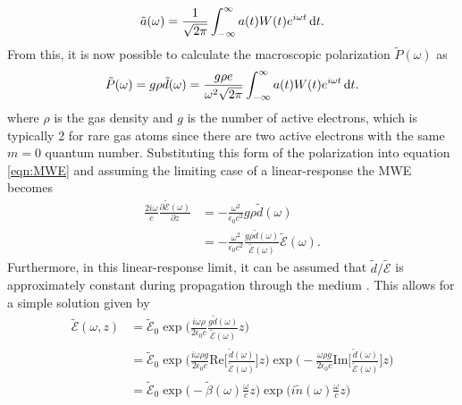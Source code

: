 \begin{equation}
	\tilde{a}(\omega)=\frac{1}{\sqrt{2\pi}}\int_{-\infty}^{\infty}a(t)W(t)e^{i\omega t}\mathop{}\!\mathrm{d} t.
\end{equation}
From this, it is now possible to calculate the macroscopic polarization $\tilde{P}(\omega)$ as 
\begin{equation}
	\tilde{P}(\omega)=g\rho\tilde{d}(\omega)=\frac{g\rho e}{\omega^2\sqrt{2\pi}} \int_{-\infty}^{\infty}a(t)W(t)e^{i\omega t}\mathop{}\!\mathrm{d} t.
\end{equation}
where $\rho$ is the gas density and $g$ is the number of active electrons, which is typically 2 for rare gas atoms since there are two active electrons with the same $m=0$ quantum number.  Substituting this form of the polarization into equation \ref{eqn:MWE} and assuming the limiting case of a linear-response the MWE becomes
\begin{equation}
	\label{eqn:MWE_linear_resp}
	\begin{aligned}
		\frac{2i\omega}{c}\frac{\partial \tilde{\mathcal{E}}(\omega)}{\partial z} &= -\frac{\omega^2}{\epsilon_0 c^2} g\rho \tilde{d}(\omega)\\
		& = -\frac{\omega^2}{\epsilon_0 c^2} \frac{g\rho \tilde{d}(\omega)}{\tilde{\mathcal{E}}(\omega)}\tilde{\mathcal{E}}(\omega).
	\end{aligned}
\end{equation}
Furthermore, in this linear-response limit, it can be assumed that $\tilde{d}/\tilde{\mathcal{E}}$ is approximately constant during propagation through the medium \cite{wuTheoryStrongfieldAttosecond2016}.  This allows for a simple solution given by
\begin{equation}
	\label{eqn:E_solution_MWE}
	\begin{aligned}
		\tilde{\mathcal{E}}(\omega,z) &= \tilde{\mathcal{E}}_0 \exp\Bigg({\frac{i\omega\rho}{2\epsilon_0 c} \frac{g\tilde{d}(\omega)}{\tilde{\mathcal{E}}(\omega)} z}\Bigg)\\
		&=\tilde{\mathcal{E}}_0 \exp\Bigg({\frac{i\omega\rho g}{2\epsilon_0 c} \mathrm{Re}\bigg[\frac{\tilde{d}(\omega)}{\tilde{\mathcal{E}}(\omega)}\bigg]z}\Bigg) \exp\Bigg(- {\frac{\omega\rho g}{2\epsilon_0 c} \mathrm{Im}\bigg[\frac{\tilde{d}(\omega)}{\tilde{\mathcal{E}}(\omega)}\bigg]z}\Bigg)\\
		&=\tilde{\mathcal{E}}_0 \exp\bigg(-\tilde{\beta}(\omega)\frac{\omega}{c}z\bigg) \exp\bigg( i\tilde{n}(\omega) \frac{\omega}{c} z\bigg)
	\end{aligned}
\end{equation}
